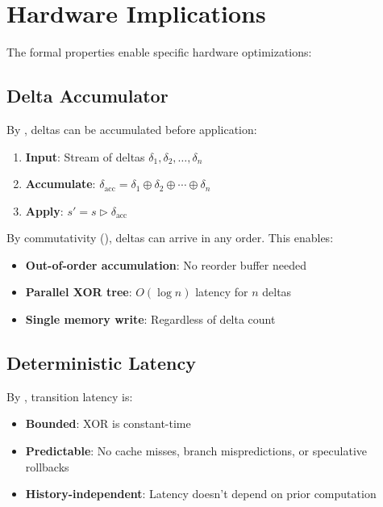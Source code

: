 \documentclass[11pt,letterpaper]{article}
\theoremstyle{plain}
\theoremstyle{definition}
\theoremstyle{remark}
\newcommand{\dcompose}{\oplus}           %
\newcommand{\transition}{\triangleright} %
\begin{document}
\section{Hardware Implications}
\label{sec:hardware}

The formal properties enable specific hardware optimizations:

\subsection{Delta Accumulator}

By , deltas can be accumulated before application:

\begin{enumerate}
    \item \textbf{Input}: Stream of deltas $\delta_1, \delta_2, \ldots, \delta_n$
    \item \textbf{Accumulate}: $\delta_{\text{acc}} = \delta_1 \dcompose \delta_2 \dcompose \cdots \dcompose \delta_n$
    \item \textbf{Apply}: $s' = s \transition \delta_{\text{acc}}$
\end{enumerate}

By commutativity (), deltas can arrive in any order. This enables:

\begin{itemize}
    \item \textbf{Out-of-order accumulation}: No reorder buffer needed
    \item \textbf{Parallel XOR tree}: $O(\log n)$ latency for $n$ deltas
    \item \textbf{Single memory write}: Regardless of delta count
\end{itemize}

\subsection{Deterministic Latency}

By , transition latency is:

\begin{itemize}
    \item \textbf{Bounded}: XOR is constant-time
    \item \textbf{Predictable}: No cache misses, branch mispredictions, or speculative rollbacks
    \item \textbf{History-independent}: Latency doesn't depend on prior computation
\end{itemize}
\end{document}
